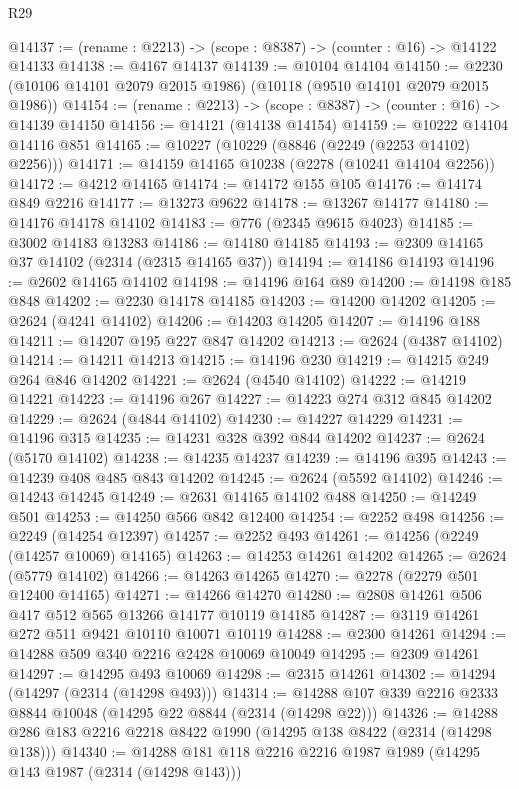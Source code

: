 \begin{lexlean}{R29}
\begin{coremodule}
@14137 := (rename : @2213) -> (scope : @8387) -> (counter : @16) -> @14122 @14133
@14138 := @4167 @14137
@14139 := @10104 @14104
@14150 := @2230 (@10106 @14101 @2079 @2015 @1986) (@10118 (@9510 @14101 @2079 @2015 @1986))
@14154 := (rename : @2213) -> (scope : @8387) -> (counter : @16) -> @14139 @14150
@14156 := @14121 (@14138 @14154)
@14159 := @10222 @14104 @14116 @851
@14165 := @10227 (@10229 (@8846 (@2249 (@2253 @14102) @2256)))
@14171 := @14159 @14165 @10238 (@2278 (@10241 @14104 @2256))
@14172 := @4212 @14165
@14174 := @14172 @155 @105
@14176 := @14174 @849 @2216
@14177 := @13273 @9622
@14178 := @13267 @14177
@14180 := @14176 @14178 @14102
@14183 := @776 (@2345 @9615 @4023)
@14185 := @3002 @14183 @13283
@14186 := @14180 @14185
@14193 := @2309 @14165 @37 @14102 (@2314 (@2315 @14165 @37))
@14194 := @14186 @14193
@14196 := @2602 @14165 @14102
@14198 := @14196 @164 @89
@14200 := @14198 @185 @848
@14202 := @2230 @14178 @14185
@14203 := @14200 @14202
@14205 := @2624 (@4241 @14102)
@14206 := @14203 @14205
@14207 := @14196 @188
@14211 := @14207 @195 @227 @847 @14202
@14213 := @2624 (@4387 @14102)
@14214 := @14211 @14213
@14215 := @14196 @230
@14219 := @14215 @249 @264 @846 @14202
@14221 := @2624 (@4540 @14102)
@14222 := @14219 @14221
@14223 := @14196 @267
@14227 := @14223 @274 @312 @845 @14202
@14229 := @2624 (@4844 @14102)
@14230 := @14227 @14229
@14231 := @14196 @315
@14235 := @14231 @328 @392 @844 @14202
@14237 := @2624 (@5170 @14102)
@14238 := @14235 @14237
@14239 := @14196 @395
@14243 := @14239 @408 @485 @843 @14202
@14245 := @2624 (@5592 @14102)
@14246 := @14243 @14245
@14249 := @2631 @14165 @14102 @488
@14250 := @14249 @501
@14253 := @14250 @566 @842 @12400
@14254 := @2252 @498
@14256 := @2249 (@14254 @12397)
@14257 := @2252 @493
@14261 := @14256 (@2249 (@14257 @10069) @14165)
@14263 := @14253 @14261 @14202
@14265 := @2624 (@5779 @14102)
@14266 := @14263 @14265
@14270 := @2278 (@2279 @501 @12400 @14165)
@14271 := @14266 @14270
@14280 := @2808 @14261 @506 @417 @512 @565 @13266 @14177 @10119 @14185
@14287 := @3119 @14261 @272 @511 @9421 @10110 @10071 @10119
@14288 := @2300 @14261
@14294 := @14288 @509 @340 @2216 @2428 @10069 @10049
@14295 := @2309 @14261
@14297 := @14295 @493 @10069
@14298 := @2315 @14261
@14302 := @14294 (@14297 (@2314 (@14298 @493)))
@14314 := @14288 @107 @339 @2216 @2333 @8844 @10048 (@14295 @22 @8844 (@2314 (@14298 @22)))
@14326 := @14288 @286 @183 @2216 @2218 @8422 @1990 (@14295 @138 @8422 (@2314 (@14298 @138)))
@14340 := @14288
    @181
    @118
    @2216
    @2216
    @1987
    @1989
    (@14295 @143 @1987 (@2314 (@14298 @143)))

\end{coremodule}
\end{lexlean}
